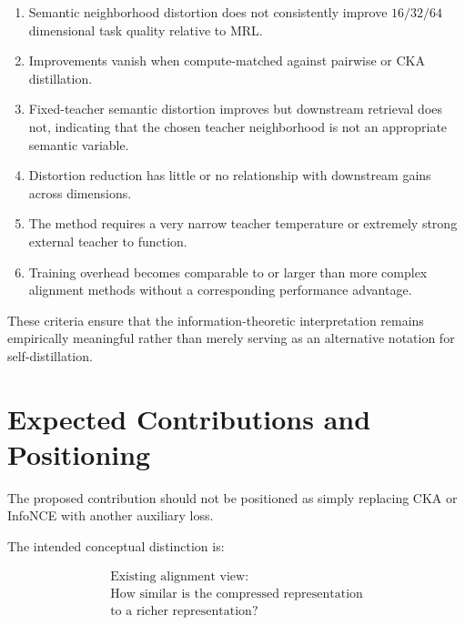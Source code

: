 \documentclass[11pt]{article}
\begin{document}
\begin{enumerate}[leftmargin=1.5em]

    \item Semantic neighborhood distortion does not consistently improve $16/32/64$ dimensional task quality relative to MRL.

    \item Improvements vanish when compute-matched against pairwise or CKA distillation.

    \item Fixed-teacher semantic distortion improves but downstream retrieval does not, indicating that the chosen teacher neighborhood is not an appropriate semantic variable.

    \item Distortion reduction has little or no relationship with downstream gains across dimensions.

    \item The method requires a very narrow teacher temperature or extremely strong external teacher to function.

    \item Training overhead becomes comparable to or larger than more complex alignment methods without a corresponding performance advantage.

\end{enumerate}

These criteria ensure that the information-theoretic interpretation remains empirically meaningful rather than merely serving as an alternative notation for self-distillation.


\section{Expected Contributions and Positioning}

The proposed contribution should not be positioned as simply replacing CKA or InfoNCE with another auxiliary loss.

The intended conceptual distinction is:

\begin{equation}
\boxed{
\begin{array}{c}
\text{Existing alignment view:}\\[2mm]
\text{How similar is the compressed representation}\\
\text{to a richer representation?}
\end{array}
}
\end{equation}
\end{document}
